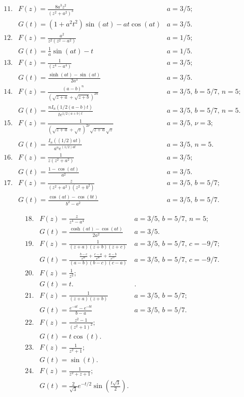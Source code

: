 \documentclass[10pt]{article}
\begin{document}
\[
\begin{array}{llr}
11. & F(z)= \frac{8a^{3}z^{2}}{(z^{2}+a^{2})^{3}} &   a=3/5; \\[1cm]
  & G(t)= (1+a^{2}t^{2})\sin(at)-at\cos(at) &  a=3/5.\\[1cm]
12. & F(z)= \frac{a^{2}}{z^{2}(z^{2}-a^{2})} &   a=1/5; \\[1cm]
  & G(t)= \frac{1}{a}\sin(at)-t &  a=1/5.\\[1cm]
13. & F(z)= \frac{1}{(z^{4}-a^{4})} &   a=3/5; \\[1cm]
  & G(t)= \frac{\sinh(at)-\sin(at)}{2a^{3}} &  a=3/5.\\[1cm]
14. & F(z)= \frac{(a-b)^{n}}{(\sqrt{z+a}+\sqrt{z+b})^{2n}} &   a=3/5, \, b=5/7, \, n=5; \\[1cm]
  & G(t)= \frac{nI_n(1/2(a-b)t)}{te^{1/2(a+b)t}} &  a=3/5, \, b=5/7, \, n=5.\\[1cm]
15. & F(z)= \frac{1}{(\sqrt{z+a}+\sqrt{z})^{2\nu}\sqrt{z+a}\sqrt{z}} &   a=3/5, \, \nu=3; \\[1cm]
  & G(t)= \frac{I_n((1/2)at)}{a^{n}e^{(1/2)at}} &  a=3/5,  \, n=5.\\[1cm]
16. & F(z)= \frac{1}{z(z^{2}+a^{2})} &   a=3/5; \\[1cm]
  & G(t)= \frac{1-\cos(at)}{a^{2}} &  a=3/5.\\[1cm]
17. & F(z)= \frac{z}{(z^{2}+a^{2})(z^{2}+b^{2})} &   a=3/5, \, b=5/7; \\[1cm]
  & G(t)= \frac{\cos(at)-\cos(bt)}{b^{2}-a^{2}} &  a=3/5, \, b=5/7.
\end{array}
\]

\[
\begin{array}{llr}
18. & F(z)= \frac{z}{z^{4}-a^{4}} &   a=3/5, \, b=5/7, \, n=5; \\[1cm]
  & G(t)= \frac{\cosh(at) -\cos(at)}{2a^{2}} &  a=3/5.\\[1cm]
19. & F(z)= \frac{1}{(z+a)(z+b)(z+c)} &   a=3/5, \, b=5/7, \, c=-9/7; \\[1cm]
  & G(t)= \frac{\frac{b-c}{e^{at}}+\frac{c-a}{e^{bt}}+\frac{a-b}{e^{ct}}}{(a-b)(b-c)(c-a)} &  a=3/5, \, b=5/7, \, c=-9/7.\\[1cm]
20. & F(z)= \frac{1}{z^{2}}; &    \\[1cm]
  & G(t)= t. & .\\[1cm]
21. & F(z)= \frac{1}{(z+a)(z+b)} &   a=3/5, \, b=5/7; \\[1cm]
  & G(t)= \frac{e^{-at}-e^{-bt}}{b-a} &  a=3/5, \, b=5/7.\\[1cm]
22. & F(z)= \frac{z^{2}-1}{(z^{2}+1)^{2}}; & \\[1cm]
  & G(t)= t \cos(t). & \\[1cm]
23. & F(z)= \frac{1}{z^{2}+1}; &  \\[1cm]
  & G(t)= \sin(t). & \\[1cm]
24. & F(z)= \frac{1}{z^{2}+z+1}; &  \\[1cm]
  & G(t)= \frac{2}{\sqrt{3}}e^{-t/2}\sin(\frac{t\sqrt{3}}{2}).& \\
\end{array}
\]
\end{document}
